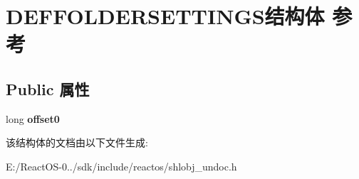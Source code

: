 \hypertarget{struct_d_e_f_f_o_l_d_e_r_s_e_t_t_i_n_g_s}{}\section{D\+E\+F\+F\+O\+L\+D\+E\+R\+S\+E\+T\+T\+I\+N\+G\+S结构体 参考}
\label{struct_d_e_f_f_o_l_d_e_r_s_e_t_t_i_n_g_s}
\subsection*{Public 属性}
\begin{DoxyCompactItemize}
\item 
\mbox{\label{struct_d_e_f_f_o_l_d_e_r_s_e_t_t_i_n_g_s_a4bf1345982047902baf4945c6aa0aa81}} 
long {\bfseries offset0}
\end{DoxyCompactItemize}


该结构体的文档由以下文件生成\+:\begin{DoxyCompactItemize}
\item 
E\+:/\+React\+O\+S-\/0../sdk/include/reactos/shlobj\+\_\+undoc.\+h\end{DoxyCompactItemize}
